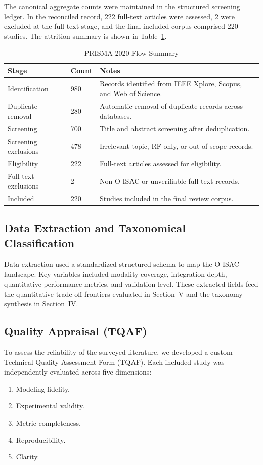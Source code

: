 The canonical aggregate counts were maintained in the structured screening ledger. In the reconciled record, 222 full-text articles were assessed, 2 were excluded at the full-text stage, and the final included corpus comprised 220 studies. The attrition summary is shown in Table~\ref{tab:prisma-flow}.

\begin{table}[!t]
\caption{PRISMA 2020 Flow Summary}
\label{tab:prisma-flow}
\centering
\footnotesize
\setlength{\tabcolsep}{5pt}
\begin{tabularx}{\textwidth}{p{}p{}X}
\toprule
\textbf{Stage} & \textbf{Count} & \textbf{Notes} \\
\midrule
Identification & 980 & Records identified from IEEE Xplore, Scopus, and Web of Science. \\
Duplicate removal & 280 & Automatic removal of duplicate records across databases. \\
Screening & 700 & Title and abstract screening after deduplication. \\
Screening exclusions & 478 & Irrelevant topic, RF-only, or out-of-scope records. \\
Eligibility & 222 & Full-text articles assessed for eligibility. \\
Full-text exclusions & 2 & Non-O-ISAC or unverifiable full-text records. \\
Included & 220 & Studies included in the final review corpus. \\
\bottomrule
\end{tabularx}
\end{table}

\subsection{Data Extraction and Taxonomical Classification}
Data extraction used a standardized structured schema to map the O-ISAC landscape. Key variables included modality coverage, integration depth, quantitative performance metrics, and validation level. These extracted fields feed the quantitative trade-off frontiers evaluated in Section~V and the taxonomy synthesis in Section~IV.

\subsection{Quality Appraisal (TQAF)}
To assess the reliability of the surveyed literature, we developed a custom Technical Quality Assessment Form (TQAF). Each included study was independently evaluated across five dimensions:
\begin{enumerate}
    \item Modeling fidelity.
    \item Experimental validity.
    \item Metric completeness.
    \item Reproducibility.
    \item Clarity.
\end{enumerate}

